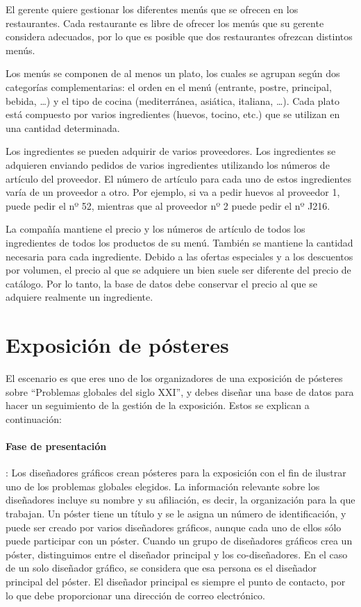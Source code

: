 \documentclass{db-practice}
\begin{document}
El gerente quiere gestionar los diferentes menús que se ofrecen en los restaurantes. Cada restaurante es libre de ofrecer los menús que su gerente considera adecuados, por lo que es posible que dos restaurantes ofrezcan distintos menús.

Los menús se componen de al menos un plato, los cuales se agrupan según dos categorías complementarias: el orden en el menú (entrante, postre, principal, bebida, \ldots) y el tipo de cocina (mediterránea, asiática, italiana, \ldots). Cada plato está compuesto por varios ingredientes (huevos, tocino, etc.) que se utilizan en una cantidad determinada.

Los ingredientes se pueden adquirir de varios proveedores. Los ingredientes se adquieren enviando pedidos de varios ingredientes utilizando los números de artículo del proveedor. El número de artículo para cada uno de estos ingredientes varía de un proveedor a otro. Por ejemplo, si va a pedir huevos al proveedor 1, puede pedir el nº 52, mientras que al proveedor nº 2 puede pedir el nº J216. 

La compañía mantiene el precio y los números de artículo de todos los ingredientes de todos los productos de su menú. También se mantiene la cantidad necesaria para cada ingrediente. Debido a las ofertas especiales y a los descuentos por volumen, el precio al que se adquiere un bien suele ser diferente del precio de catálogo. Por lo tanto, la base de datos debe conservar el precio al que se adquiere realmente un ingrediente.

\section{Exposición de pósteres}
El escenario es que eres uno de los organizadores de una exposición de pósteres sobre ``Problemas globales del siglo XXI'', y debes diseñar una base de datos para hacer un seguimiento de la gestión de la exposición.  Estos se explican a continuación:

\paragraph{Fase de presentación}: Los diseñadores gráficos crean pósteres para la exposición con el fin de ilustrar uno de los problemas globales elegidos.  La información relevante sobre los diseñadores incluye su nombre y su afiliación, es decir, la organización para la que trabajan.  Un póster tiene un título y se le asigna un número de identificación, y puede ser creado por varios diseñadores gráficos, aunque cada uno de ellos sólo puede participar con un póster.  Cuando un grupo de diseñadores gráficos crea un póster, distinguimos entre el diseñador principal y los co-diseñadores.  En el caso de un solo diseñador gráfico, se considera que esa persona es el diseñador principal del póster.  El diseñador principal es siempre el punto de contacto, por lo que debe proporcionar una dirección de correo electrónico.
\end{document}

